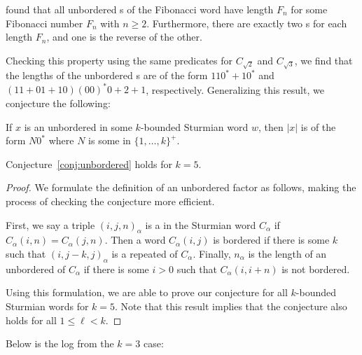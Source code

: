 found that all unbordered \factor{}s of the Fibonacci word have length $F_n$ for some Fibonacci number $F_n$ with $n \geq 2$.
Furthermore, there are exactly two \factor{}s for each length $F_n$, and one is the reverse of the other.

Checking this property using the same predicates for $C_{\sqrt{2}}$ and $C_{\sqrt{3}}$, we find that the lengths of the unbordered \factor{}s are of the form $110^* + 10^*$ and $(11 + 01 + 10)(00)^*0+2+1$, respectively.
Generalizing this result, we conjecture the following:

\begin{conjecture}\label{conj:unbordered}
    If $x$ is an unbordered \factor in some $k$-bounded Sturmian word $w$, then $|x|$ is of the form $N0^*$ where $N$ is some \word in $\{1,\ldots,k\}^+$.
\end{conjecture}

\begin{theorem}\label{thm:unbordered}
Conjecture~\ref{conj:unbordered} holds for $k = 5$.
\end{theorem}
\begin{proof}
We formulate the definition of an unbordered factor as follows, making the process of checking the conjecture more efficient.

First, we say a triple $(i,j,n)_{\alpha}$ is a  in the Sturmian word $C_{\alpha}$ if $C_{\alpha}(i,n) = C_{\alpha}(j,n)$.
Then a word $C_{\alpha}(i,j)$ is bordered if there is some $k$ such that $(i,j-k,j)_{\alpha}$ is a repeated \factor of $C_{\alpha}$.
Finally, $n_{\alpha}$ is the length of an unbordered \factor of $C_{\alpha}$ if there is some $i > 0$ such that $C_{\alpha}(i, i+n)$ is not bordered.

Using this formulation, we are able to prove our conjecture for all $k$-bounded Sturmian words for $k=5$.
Note that this result implies that the conjecture also holds for all $1 \leq \ell < k$.
\end{proof}

Below is the log from the $k=3$ case:

